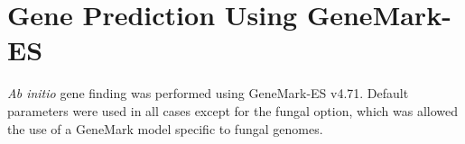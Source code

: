 




\section{Gene Prediction Using GeneMark-ES}

\textit{Ab initio} gene finding was performed using GeneMark-ES
v4.71\cite{Borodovsky2011}. Default parameters were used in all cases
except for the fungal option, which was allowed the use of a GeneMark
model specific to fungal genomes.

%

